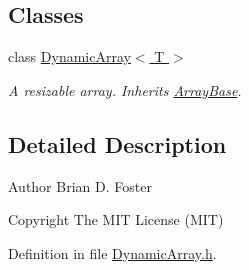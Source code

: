 \subsection*{Classes}
\begin{DoxyCompactItemize}
\item 
class \hyperlink{a00002}{Dynamic\+Array$<$ T $>$}
\begin{DoxyCompactList}\small\item\em A resizable array. Inherits \hyperlink{a00001}{Array\+Base}. \end{DoxyCompactList}\end{DoxyCompactItemize}


\subsection{Detailed Description}
\begin{DoxyAuthor}{Author}
Brian D. Foster 
\end{DoxyAuthor}
\begin{DoxyCopyright}{Copyright}
The M\+I\+T License (M\+I\+T) 
\end{DoxyCopyright}


Definition in file \hyperlink{a00006_source}{Dynamic\+Array.\+h}.

